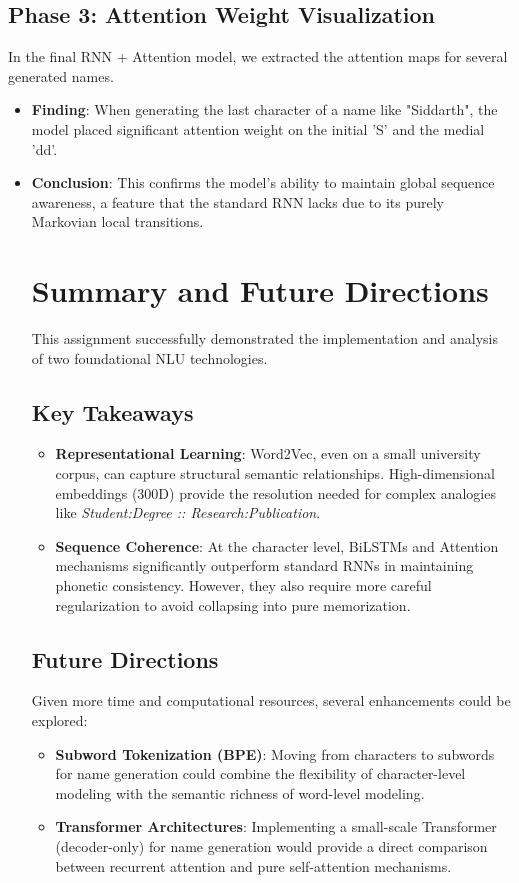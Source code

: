 \documentclass[12pt,a4paper]{article}
\begin{document}
\subsection{Phase 3: Attention Weight Visualization}
In the final RNN + Attention model, we extracted the attention maps for several generated names.
\begin{itemize}
    \item \textbf{Finding}: When generating the last character of a name like "Siddarth", the model placed significant attention weight on the initial 'S' and the medial 'dd'.
    \item \textbf{Conclusion}: This confirms the model's ability to maintain global sequence awareness, a feature that the standard RNN lacks due to its purely Markovian local transitions.

\section{Summary and Future Directions}
This assignment successfully demonstrated the implementation and analysis of two foundational NLU technologies.

\subsection{Key Takeaways}
\begin{itemize}
    \item \textbf{Representational Learning}: Word2Vec, even on a small university corpus, can capture structural semantic relationships. High-dimensional embeddings (300D) provide the resolution needed for complex analogies like \textit{Student:Degree :: Research:Publication}.
    \item \textbf{Sequence Coherence}: At the character level, BiLSTMs and Attention mechanisms significantly outperform standard RNNs in maintaining phonetic consistency. However, they also require more careful regularization to avoid collapsing into pure memorization.
\end{itemize}

\subsection{Future Directions}
Given more time and computational resources, several enhancements could be explored:
\begin{itemize}
    \item \textbf{Subword Tokenization (BPE)}: Moving from characters to subwords for name generation could combine the flexibility of character-level modeling with the semantic richness of word-level modeling.
    \item \textbf{Transformer Architectures}: Implementing a small-scale Transformer (decoder-only) for name generation would provide a direct comparison between recurrent attention and pure self-attention mechanisms.
\end{itemize}


\end{itemize}
\end{document}
